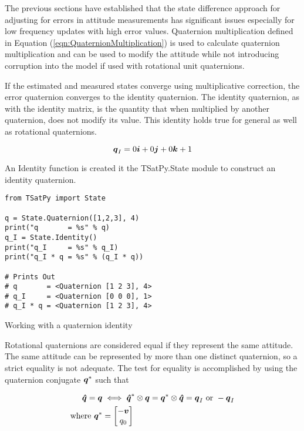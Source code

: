 The previous sections have established that the state difference approach for adjusting for errors in attitude measurements has significant issues especially for low frequency updates with high error values.  Quaternion multiplication defined in Equation (\ref{eqn:QuaternionMultiplication}) is used to calculate quaternion multiplication and can be used to modify the attitude while not introducing corruption into the model if used with rotational unit quaternions.

If the estimated and measured states converge using multiplicative correction, the error quaternion converges to the identity quaternion.  The identity quaternion, as with the identity matrix, is the quantity that when multiplied by another quaternion, does not modify its value.  This identity holds true for general as well as rotational quaternions.

\begin{equation}
  \boldsymbol{q}_I = 0 \boldsymbol{i} + 0 \boldsymbol{j} + 0 \boldsymbol{k} + 1
\end{equation}

An Identity function is created it the TSatPy.State module to construct an identity quaternion.

\begin{listing}
\begin{singlespace}
  \begin{verbatim}
from TSatPy import State

q = State.Quaternion([1,2,3], 4)
print("q       = %s" % q)
q_I = State.Identity()
print("q_I     = %s" % q_I)
print("q_I * q = %s" % (q_I * q))

# Prints Out
# q       = <Quaternion [1 2 3], 4>
# q_I     = <Quaternion [0 0 0], 1>
# q_I * q = <Quaternion [1 2 3], 4>
  \end{verbatim}
\caption{Working with a quaternion identity}
\nocite{minted}
\end{singlespace}
\end{listing}

Rotational quaternions are considered equal if they represent the same attitude.  The same attitude can be represented by more than one distinct quaternion, so a strict equality is not adequate.  The test for equality is accomplished by using the quaternion conjugate $\boldsymbol{q}^*$ such that

\begin{subequations}
  \begin{align}
    \boldsymbol{\hat{q}} = \boldsymbol{q} & \iff \boldsymbol{\hat{q}}^* \otimes \boldsymbol{q} = \boldsymbol{q}^* \otimes \boldsymbol{\hat{q}} = \boldsymbol{q}_I \text{ or } -\boldsymbol{q}_I \\
    \text{where } \boldsymbol{q}^* &= \begin{bmatrix} -\boldsymbol{v} \\ q_0 \end{bmatrix}
  \end{align}
  \label{eqn:QuaternionEquality}
\end{subequations}

